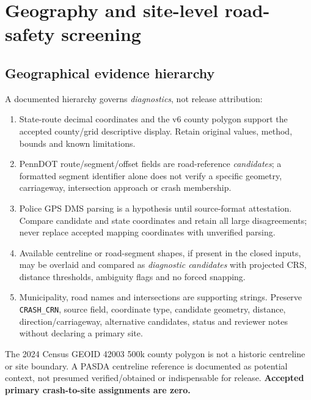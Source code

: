 \documentclass[11pt,a4paper,openany]{report}
\newcommand{\pathcode}[1]{\nolinkurl{#1}}
\begin{document}
\chapter{Geography and site-level road-safety screening}
\section{Geographical evidence hierarchy}
A documented hierarchy governs \emph{diagnostics}, not release attribution:
\begin{enumerate}
\item State-route decimal coordinates and the v6 county polygon support the accepted county/grid descriptive display. Retain original values, method, bounds and known limitations.
\item PennDOT route/segment/offset fields are road-reference \emph{candidates}; a formatted segment identifier alone does not verify a specific geometry, carriageway, intersection approach or crash membership.
\item Police GPS DMS parsing is a hypothesis until source-format attestation. Compare candidate and state coordinates and retain all large disagreements; never replace accepted mapping coordinates with unverified parsing.
\item Available centreline or road-segment shapes, if present in the closed inputs, may be overlaid and compared as \emph{diagnostic candidates} with projected CRS, distance thresholds, ambiguity flags and no forced snapping.
\item Municipality, road names and intersections are supporting strings. Preserve \pathcode{CRASH_CRN}, source field, coordinate type, candidate geometry, distance, direction/carriageway, alternative candidates, status and reviewer notes without declaring a primary site.
\end{enumerate}
The 2024 Census GEOID 42003 500k county polygon is not a historic centreline or site boundary. A PASDA centreline reference \cite{PASDA} is documented as potential context, not presumed verified/obtained or indispensable for release. \textbf{Accepted primary crash-to-site assignments are zero.}
\end{document}
